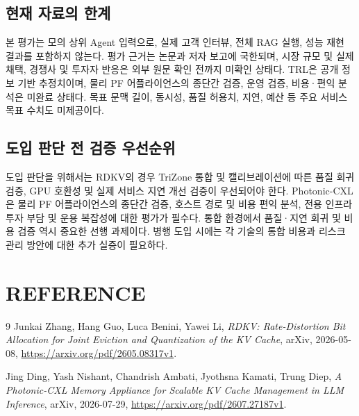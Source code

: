 \documentclass[11pt,a4paper]{article}
\begin{document}
\subsection{현재 자료의 한계}
본 평가는 모의 상위 Agent 입력으로, 실제 고객 인터뷰, 전체 RAG 실행, 성능 재현 결과를 포함하지 않는다. 평가 근거는 논문과 저자 보고에 국한되며, 시장 규모 및 실제 채택, 경쟁사 및 투자자 반응은 외부 원문 확인 전까지 미확인 상태다. TRL은 공개 정보 기반 추정치이며, 물리 PF 어플라이언스의 종단간 검증, 운영 검증, 비용·편익 분석은 미완료 상태다. 목표 문맥 길이, 동시성, 품질 허용치, 지연, 예산 등 주요 서비스 목표 수치도 미제공이다.

\subsection{도입 판단 전 검증 우선순위}
도입 판단을 위해서는 RDKV의 경우 TriZone 통합 및 캘리브레이션에 따른 품질 회귀 검증, GPU 호환성 및 실제 서비스 지연 개선 검증이 우선되어야 한다. Photonic-CXL은 물리 PF 어플라이언스의 종단간 검증, 호스트 경로 및 비용 편익 분석, 전용 인프라 투자 부담 및 운용 복잡성에 대한 평가가 필수다. 통합 환경에서 품질·지연 회귀 및 비용 검증 역시 중요한 선행 과제이다. 병행 도입 시에는 각 기술의 통합 비용과 리스크 관리 방안에 대한 추가 실증이 필요하다.

\section{REFERENCE}
\renewcommand{\refname}{}
\begin{thebibliography}{9}
Junkai Zhang, Hang Guo, Luca Benini, Yawei Li,
\textit{RDKV: Rate-Distortion Bit Allocation for Joint Eviction and Quantization of the KV Cache},
arXiv, 2026-05-08,
\url{https://arxiv.org/pdf/2605.08317v1}.

Jing Ding, Yash Nishant, Chandrish Ambati, Jyothsna Kamati, Trung Diep,
\textit{A Photonic-CXL Memory Appliance for Scalable KV Cache Management in LLM Inference},
arXiv, 2026-07-29,
\url{https://arxiv.org/pdf/2607.27187v1}.
\end{thebibliography}
\end{document}
